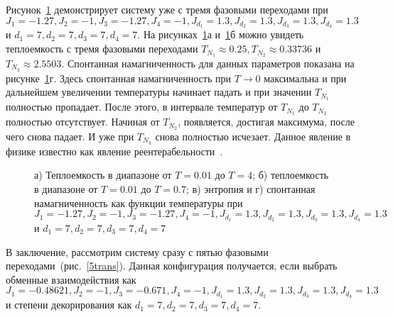 Рисунок~\ref{3trans} демонстрирует систему уже с тремя фазовыми переходами при $J_1 = -1.27, J_2 = -1, J_3 = -1.27, J_4 = -1, J_{d_1} = 1.3, J_{d_2} = 1.3, J_{d_3} = 1.3, J_{d_4} = 1.3$ и $d_1 = 7, d_2 = 7, d_3 = 7, d_4 = 7$. На рисунках~\ref{3trans}а и~\ref{3trans}б можно увидеть теплоемкость с тремя фазовыми переходами $T_{N_1} \approx 0.25, T_{N_2} \approx 0.33736$ и $T_{N_3} \approx 2.5503$. 
Спонтанная намагниченность для данных параметров показана на рисунке~\ref{3trans}г. Здесь спонтанная намагниченность при $T \rightarrow 0$ максимальна и при дальнейшем увеличении температуры начинает падать и при значении $T_{N_1}$ полностью пропадает. После этого, в интервале температур от $T_{N_1}$ до $T_{N_2}$ полностью отсутствует. Начиная от $T_{N_2}$, появляется, достигая максимума, после чего снова падает. И уже при $T_{N_3}$ снова полностью исчезает. Данное явление в физике известно как явление реентерабельности~\cite{vaks1966}. 

 \begin{figure}[h]
	\begin{minipage}{0.47\linewidth}
	\end{minipage}
	\hfill
	\begin{minipage}{0.47\linewidth}
	\end{minipage}
	\vfill
	\begin{minipage}{0.47\linewidth}
	\end{minipage}
	\hfill
	\begin{minipage}{0.47\linewidth}
	\end{minipage}
	\caption{а) Теплоемкость в диапазоне от $T=0.01$ до $T=4$; б) теплоемкость в диапазоне от $T=0.01$ до $T=0.7$; в) энтропия и г) спонтанная намагниченность как функции температуры при $J_1 = -1.27, J_2 = -1, J_3 = -1.27, J_4 = -1, J_{d_1} = 1.3, J_{d_2} = 1.3, J_{d_3} = 1.3, J_{d_4} = 1.3$ и $d_1 = 7, d_2 = 7, d_3 = 7, d_4 = 7$}
	\label{3trans}
\end{figure}

В заключение, рассмотрим систему сразу с пятью фазовыми переходами~(рис.~\ref{5trans}). Данная конфигурация получается, если выбрать обменные взаимодействия как $J_1 = -0.48621, J_2 = -1, J_3 = -0.671, J_4 = -1, J_{d_1} = 1.3, J_{d_2} = 1.3, J_{d_3} = 1.3, J_{d_4} = 1.3$ и степени декорирования как $d_1 = 7, d_2 = 7, d_3 = 7, d_4 = 7$. 

